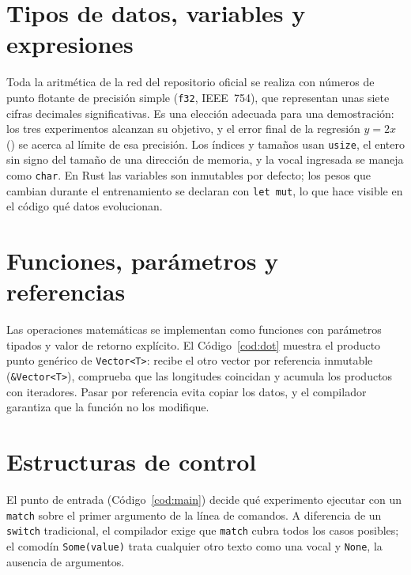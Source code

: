 \section{Tipos de datos, variables y expresiones}
Toda la aritmética de la red del repositorio oficial se realiza con números de punto flotante de precisión simple (\texttt{f32}, IEEE~754), que representan unas siete cifras decimales significativas. Es una elección adecuada para una demostración: los tres experimentos alcanzan su objetivo, y el error final de la regresión $y=2x$ (\OfLinMseFin) se acerca al límite de esa precisión. Los índices y tamaños usan \texttt{usize}, el entero sin signo del tamaño de una dirección de memoria, y la vocal ingresada se maneja como \texttt{char}. En Rust las variables son inmutables por defecto; los pesos que cambian durante el entrenamiento se declaran con \texttt{let mut}, lo que hace visible en el código qué datos evolucionan.

\section{Funciones, parámetros y referencias}
Las operaciones matemáticas se implementan como funciones con parámetros tipados y valor de retorno explícito. El Código~\ref{cod:dot} muestra el producto punto genérico de \texttt{Vector<T>}: recibe el otro vector por referencia inmutable (\texttt{\&Vector<T>}), comprueba que las longitudes coincidan y acumula los productos con iteradores. Pasar por referencia evita copiar los datos, y el compilador garantiza que la función no los modifique.



\section{Estructuras de control}
El punto de entrada (Código~\ref{cod:main}) decide qué experimento ejecutar con un \texttt{match} sobre el primer argumento de la línea de comandos. A diferencia de un \texttt{switch} tradicional, el compilador exige que \texttt{match} cubra todos los casos posibles; el comodín \texttt{Some(value)} trata cualquier otro texto como una vocal y \texttt{None}, la ausencia de argumentos.



